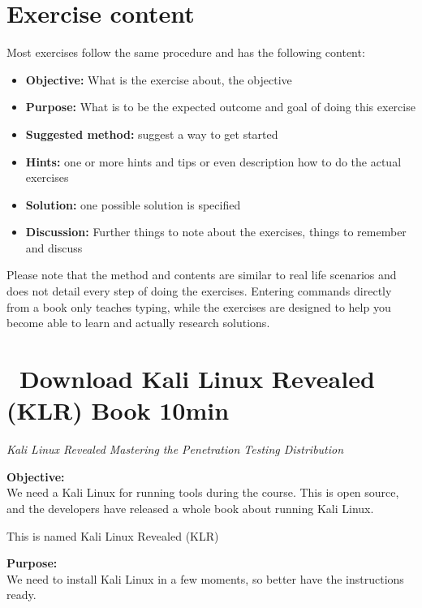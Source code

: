 \documentclass[a4paper,11pt,notitlepage]{report}
\begin{document}

\chapter*{\color{titlecolor}Exercise content}

Most exercises follow the same procedure and has the following content:
\begin{itemize}
\item {\bf Objective:} What is the exercise about, the objective
\item {\bf Purpose:} What is to be the expected outcome and goal of doing this exercise
\item {\bf Suggested method:} suggest a way to get started
\item {\bf Hints:} one or more hints and tips or even description how to
do the actual exercises
\item {\bf Solution:} one possible solution is specified
\item {\bf Discussion:} Further things to note about the exercises, things to remember and discuss
\end{itemize}

Please note that the method and contents are similar to real life scenarios and does not detail every step of doing the exercises. Entering commands directly from a book only teaches typing, while the exercises are designed to help you become able to learn and actually research solutions.


\chapter{\faExclamationTriangle\ Download Kali Linux Revealed (KLR) Book 10min}
\label{ex:downloadKLR}



\emph{Kali Linux Revealed  Mastering the Penetration Testing Distribution}


{\bf Objective:}\\
We need a Kali Linux for running tools during the course. This is open source, and the developers have released a whole book about running Kali Linux.

This is named Kali Linux Revealed (KLR)

{\bf Purpose:}\\
We need to install Kali Linux in a few moments, so better have the instructions ready.
\end{document}
